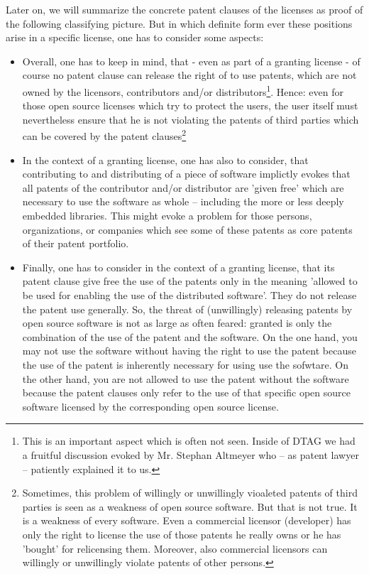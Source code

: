 Later on, we will summarize the concrete patent clauses of the licenses as proof
of the following classifying picture. But in which definite form ever these
positions arise in a specific license, one has to consider some aspects:

\begin{itemize}
  
  \item  Overall, one has to keep in mind, that - even as part of a granting
  license - of course no patent clause can release the right of to use patents,
  which are not owned by the licensors, contributors and/or
  distributors\footnote{This is an important aspect which is often not seen.
  Inside of DTAG we had a fruitful discussion evoked by Mr. Stephan Altmeyer who
  -- as patent lawyer -- patiently explained it to us.}. Hence: even for those
  open source licenses which try to protect the users, the user itself must
  nevertheless ensure that he is not violating the patents of third parties
  which can be covered by the patent clauses\footnote{Sometimes, this problem of
  willingly or unwillingly vioaleted patents of third parties is seen as a
  weakness of open source software. But that is not true. It is a weakness of
  every software. Even a commercial licensor (developer) has only the right to
  license the use of those patents he really owns or he has 'bought' for
  relicensing them. Moreover, also commercial licensors can willingly or
  unwillingly violate patents of other persons.}
  
  \item In the context of a granting license, one has also to consider, that
  contributing to and distributing of a piece of software implictly evokes that
  all patents of the contributor and/or distributor are 'given free' which are
  necessary to use the software as whole -- including the more or less deeply
  embedded libraries. This might evoke a problem for those persons,
  organizations, or companies which see some of these patents as core patents of
  their patent portfolio.
  
  \item Finally, one has to consider in the context of a granting license, that
  its patent clause give free the use of the patents only in the meaning
  'allowed to be used for enabling the use of the distributed software'. They do
  not release the patent use generally. So, the threat of (unwillingly)
  releasing patents by open source software is not as large as often feared:
  granted is only the combination of the use of the patent and the software. On
  the one hand, you may not use the software without having the right to use the
  patent because the use of the patent is inherently necessary for using use the
  sofwtare. On the other hand, you are not allowed to use the patent without the
  software because the patent clauses only refer to the use of that specific
  open source software licensed by the corresponding open source license.


\end{itemize}
